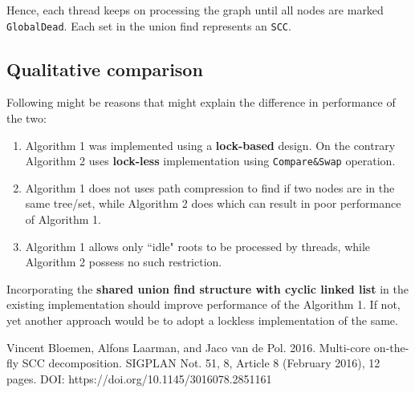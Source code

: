 \documentclass[a4paper]{article}
\begin{document}
Hence, each thread keeps on processing the graph until all nodes are marked \texttt{GlobalDead}.
Each set in the union find represents an \texttt{SCC}.

\subsection{Qualitative comparison}

Following might be reasons that might explain the difference in performance of the two:
\begin{enumerate}
    \item Algorithm 1 was implemented using a \textbf{lock-based} design. On the contrary Algorithm 2 uses \textbf{lock-less} implementation using \texttt{Compare\&Swap} operation.
    \item Algorithm 1 does not uses path compression to find if two nodes are in the same tree/set, while Algorithm 2 does which can result in poor performance of Algorithm 1.
    \item Algorithm 1 allows only ``idle" roots to be processed by threads, while Algorithm 2 possess no such restriction.
\end{enumerate}

Incorporating the \textbf{shared union find structure with cyclic linked list} in the existing implementation should improve performance of the Algorithm 1. If not, yet another approach would be to adopt a lockless implementation of the same.

\begin{thebibliography}{9}
  Vincent Bloemen, Alfons Laarman, and Jaco van de Pol. 2016. Multi-core on-the-fly SCC decomposition. SIGPLAN Not. 51, 8, Article 8 (February 2016), 12 pages. DOI: https://doi.org/10.1145/3016078.2851161

\end{thebibliography}
\end{document}
